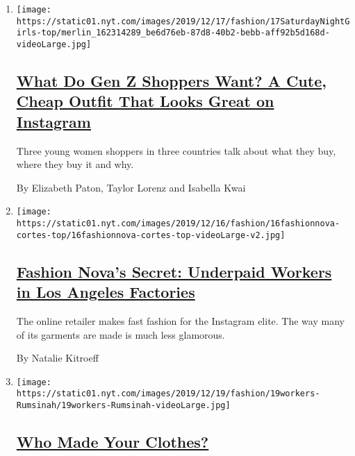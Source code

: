 \begin{enumerate}
\def\labelenumi{\arabic{enumi}.}
\item
  \texttt{[image: https://static01.nyt.com/images/2019/12/17/fashion/17SaturdayNightGirls-top/merlin\_162314289\_be6d76eb-87d8-40b2-bebb-aff92b5d168d-videoLarge.jpg]}

  \hypertarget{what-do-gen-z-shoppers-want-a-cute-cheap-outfit-that-looks-great-on-instagram}{%
  \subsection{\texorpdfstring{\href{/2019/12/17/style/fast-fashion-gen-z.html}{What
  Do Gen Z Shoppers Want? A Cute, Cheap Outfit That Looks Great on
  Instagram}}{What Do Gen Z Shoppers Want? A Cute, Cheap Outfit That Looks Great on Instagram}}\label{what-do-gen-z-shoppers-want-a-cute-cheap-outfit-that-looks-great-on-instagram}}

  Three young women shoppers in three countries talk about what they
  buy, where they buy it and why.

  By Elizabeth Paton, Taylor Lorenz and Isabella Kwai
\item
  \texttt{[image: https://static01.nyt.com/images/2019/12/16/fashion/16fashionnova-cortes-top/16fashionnova-cortes-top-videoLarge-v2.jpg]}

  \hypertarget{fashion-novas-secret-underpaid-workers-in-los-angeles-factories}{%
  \subsection{\texorpdfstring{\href{/2019/12/16/business/fashion-nova-underpaid-workers.html}{Fashion
  Nova's Secret: Underpaid Workers in Los Angeles
  Factories}}{Fashion Nova's Secret: Underpaid Workers in Los Angeles Factories}}\label{fashion-novas-secret-underpaid-workers-in-los-angeles-factories}}

  The online retailer makes fast fashion for the Instagram elite. The
  way many of its garments are made is much less glamorous.

  By Natalie Kitroeff
\item
  \texttt{[image: https://static01.nyt.com/images/2019/12/19/fashion/19workers-Rumsinah/19workers-Rumsinah-videoLarge.jpg]}

  \hypertarget{who-made-your-clothes}{%
  \subsection{\texorpdfstring{\href{/2019/12/19/style/garment-workers-around-the-world.html}{Who
  Made Your
  Clothes?}}{Who Made Your Clothes?}}\label{who-made-your-clothes}}


\end{enumerate}

